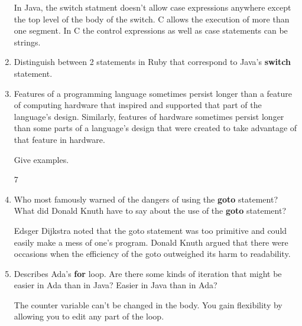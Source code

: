 \begin{enumerate}
\begin{answer}
    In Java, the switch statment doesn't allow case expressions anywhere except
the top level of the body of the switch.  C allows the execution of more than one
segment.  In C the control expressions as well as case statements can be strings.

    \end{answer}

  \item Distinguish between 2 statements in Ruby
    that correspond to Java's \textbf{switch} statement.

  \item Features of a programming language sometimes persist
    longer than a feature of computing hardware that inspired
    and supported that part of the language's design.
    Similarly, features of hardware sometimes persist longer
    than some parts of a language's design that were created
    to take advantage of that feature in hardware.

    Give examples.

 \begin{answer}

7

    \end{answer}

  \item Who most famously warned of the dangers of using the
    \textbf{goto} statement? What did Donald Knuth have to
    say about the use of the \textbf{goto} statement?

 \begin{answer}

 Edsger Dijkstra noted that the goto statement was too primitive and could
easily make a mess of one's program.  Donald Knuth argued that there were
occasions when the efficiency of the goto outweighed its harm to readability.

    \end{answer}


  \item Describes Ada's \textbf{for} loop. Are there some
    kinds of iteration that might be easier in Ada than
    in Java? Easier in Java than in Ada?

  \begin{answer}

    The counter variable can't be changed in the body.  You gain flexibility by
allowing you to edit any part of the loop.

    \end{answer}


\end{enumerate}
